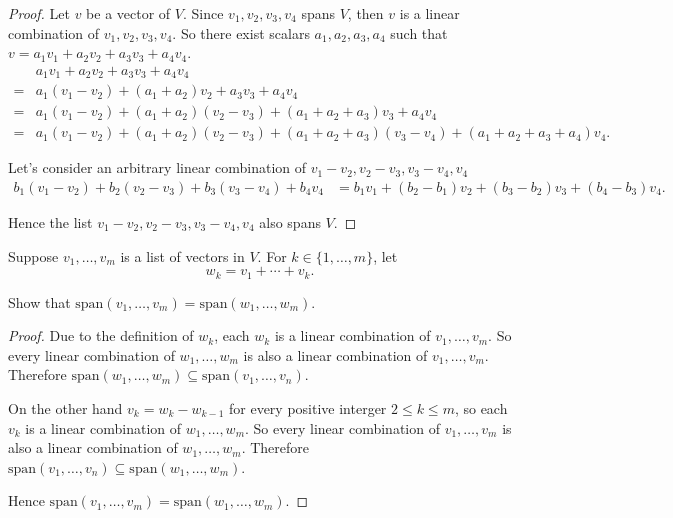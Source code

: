 \begin{proof}
    Let $v$ be a vector of $V$. Since $v_{1}, v_{2}, v_{3}, v_{4}$ spans $V$, then $v$ is a linear combination of $v_{1}, v_{2}, v_{3}, v_{4}$. So there exist scalars $a_{1}, a_{2}, a_{3}, a_{4}$ such that $v = a_{1}v_{1} + a_{2}v_{2} + a_{3}v_{3} + a_{4}v_{4}$.
    \begin{align*}
          & a_{1}v_{1} + a_{2}v_{2} + a_{3}v_{3} + a_{4}v_{4}                                                                                      \\
        = & a_{1}(v_{1} - v_{2}) + (a_{1} + a_{2})v_{2} + a_{3}v_{3} + a_{4}v_{4}                                                                  \\
        = & a_{1}(v_{1} - v_{2}) + (a_{1} + a_{2})(v_{2} - v_{3}) + (a_{1} + a_{2} + a_{3})v_{3} + a_{4}v_{4}                                      \\
        = & a_{1}(v_{1} - v_{2}) + (a_{1} + a_{2})(v_{2} - v_{3}) + (a_{1} + a_{2} + a_{3})(v_{3} - v_{4}) + (a_{1} + a_{2} + a_{3} + a_{4})v_{4}.
    \end{align*}

    Let's consider an arbitrary linear combination of $v_{1} - v_{2}, v_{2} - v_{3}, v_{3} - v_{4}, v_{4}$
    \begin{align*}
        b_{1}(v_{1} - v_{2}) + b_{2}(v_{2} - v_{3}) + b_{3}(v_{3} - v_{4}) + b_{4}v_{4} & = b_{1}v_{1} + (b_{2} - b_{1})v_{2} + (b_{3} - b_{2})v_{3} + (b_{4} - b_{3})v_{4}.
    \end{align*}

    Hence the list $v_{1} - v_{2}, v_{2} - v_{3}, v_{3} - v_{4}, v_{4}$ also spans $V$.
\end{proof}

\begin{exercise}\label{chapter2:sectionA:exercise3}
    Suppose $v_{1}, \ldots, v_{m}$ is a list of vectors in $V$. For $k\in \{ 1, \ldots, m \}$, let
    \[
        w_{k} = v_{1} + \cdots + v_{k}.
    \]

    Show that $\text{span}(v_{1}, \ldots, v_{m}) = \text{span}(w_{1}, \ldots, w_{m})$.
\end{exercise}

\begin{proof}
    Due to the definition of $w_{k}$, each $w_{k}$ is a linear combination of $v_{1}, \ldots, v_{m}$. So every linear combination of $w_{1}, \ldots, w_{m}$ is also a linear combination of $v_{1}, \ldots, v_{m}$. Therefore $\text{span}(w_{1}, \ldots, w_{m})\subseteq \text{span}(v_{1}, \ldots, v_{n})$.

    On the other hand $v_{k} = w_{k} - w_{k-1}$ for every positive interger $2\leq k\leq m$, so each $v_{k}$ is a linear combination of $w_{1}, \ldots, w_{m}$. So every linear combination of $v_{1}, \ldots, v_{m}$ is also a linear combination of $w_{1}, \ldots, w_{m}$. Therefore $\text{span}(v_{1}, \ldots, v_{n})\subseteq \text{span}(w_{1}, \ldots, w_{m})$.

    Hence $\text{span}(v_{1}, \ldots, v_{m}) = \text{span}(w_{1}, \ldots, w_{m})$.
\end{proof}

